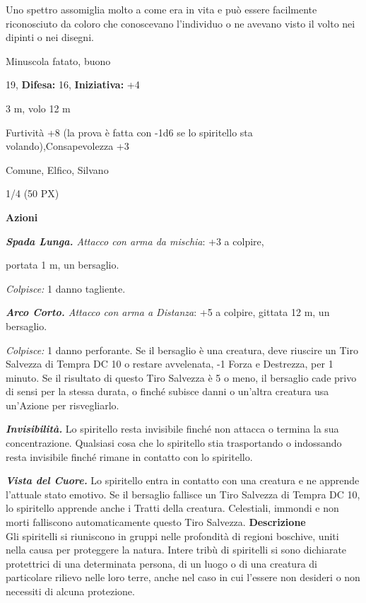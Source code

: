 \begin{multicols}{2}
{Uno spettro assomiglia molto a come era in vita e può essere facilmente riconosciuto da coloro che conoscevano l’individuo o ne avevano visto il volto nei dipinti o nei disegni.

\noindent
\begin{description}[noitemsep, topsep=0pt, parsep=0pt, partopsep=0pt, leftmargin=0cm, labelwidth=2.2cm]
	\item[\textbf{Taglia/Tipo:}] Minuscola fatato, buono
	\item[\textbf{Caratt.:}] 
	\item[\textbf{Punti Ferita:}] 19,  \textbf{Difesa:} 16,  \textbf{Iniziativa:} +4
	\item[\textbf{Movimento:}] 3 m, volo 12 m
	\item[\textbf{Tiri Salvez.:}] 
	\item[\textbf{Comp.:}] Furtività +8 (la prova è fatta con -1d6 se lo spiritello sta volando),Consapevolezza +3
	\item[\textbf{Linguaggi:}] Comune, Elfico, Silvano
	\item[\textbf{Sfida:}] 1/4 (50 PX)\smallskip
\end{description}

\textbf{Azioni}

\emph{\textbf{Spada Lunga.} Attacco con arma da mischia}: +3 a colpire,

portata 1 m, un bersaglio.

\emph{Colpisce:} 1 danno tagliente.

\emph{\textbf{Arco Corto.} Attacco con arma a Distanza}: +5 a colpire, gittata 12 m, un bersaglio.

\emph{Colpisce:} 1 danno perforante. Se il bersaglio è una creatura, deve riuscire un Tiro Salvezza di Tempra DC 10 o restare avvelenata, -1 Forza e Destrezza, per 1 minuto. Se il risultato di questo Tiro Salvezza è 5 o meno, il bersaglio cade privo di sensi per la stessa durata, o finché subisce danni o un'altra creatura usa un'Azione per risvegliarlo.

\emph{\textbf{Invisibilità.}} Lo spiritello resta invisibile finché non attacca o termina la sua concentrazione. Qualsiasi cosa che lo spiritello stia trasportando o indossando resta invisibile finché rimane in contatto con lo spiritello.

\emph{\textbf{Vista del Cuore.}} Lo spiritello entra in contatto con una creatura e ne apprende l'attuale stato emotivo. Se il bersaglio fallisce un Tiro Salvezza di Tempra DC 10, lo spiritello apprende anche i Tratti della creatura. Celestiali, immondi e non morti falliscono automaticamente questo Tiro Salvezza.
\textbf{Descrizione}\\
Gli spiritelli si riuniscono in gruppi nelle profondità di regioni boschive, uniti nella causa per proteggere la natura. Intere tribù di spiritelli si sono dichiarate protettrici di una determinata persona, di un luogo o di una creatura di particolare rilievo nelle loro terre, anche nel caso in cui l'essere non desideri o non necessiti di alcuna protezione.

}
\end{multicols}
